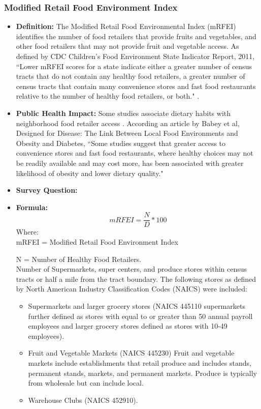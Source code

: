 \documentclass[12pt,letterpaper]{report}
\begin{document}
\subsubsection{Modified Retail Food Environment Index}
	\begin{itemize}
		\item \textbf{Definition:} The Modified Retail Food Environmental Index (mRFEI) identifies the number of food retailers that provide fruits and vegetables, and other food retailers that may not provide fruit and vegetable access. As defined by CDC Children’s Food Environment State Indicator Report, 2011, ``Lower mRFEI scores for a state indicate either a greater number of census tracts that do not contain any healthy food retailers, a greater number of census tracts that contain many convenience stores and fast food restaurants relative to the number of healthy food retailers, or both." \cite{CDCFoodEnvt2011}.
		\item \textbf{Public Health Impact:} Some studies associate dietary habits with neighborhood food retailer access \cite{story2008creating}. According an article by Babey et al, Designed for Disease: The Link Between Local Food Environments and Obesity and Diabetes, ``Some studies suggest that greater access to convenience stores and fast food restaurants, where healthy choices may not be readily available and may cost more, has been associated with greater likelihood of obesity and lower dietary quality."  \cite{babey2008designed} 
		\item \textbf{Survey Question:}
		\item \textbf{Formula:} 
			\begin{equation}
				mRFEI = \frac{N}{D} *100
			\end{equation}
Where: \\
			mRFEI = Modified Retail Food Environment Index
			
			N = Number of Healthy Food Retailers.
\\ Number of Supermarkets, super centers, and produce stores within census tracts or half a mile from the tract boundary. The following stores as defined by North American Industry Classification Codes (NAICS) were included: 
\begin{itemize}
  \item Supermarkets and larger grocery stores (NAICS 445110 supermarkets further defined as stores with equal to or greater than 50 annual payroll employees and larger grocery stores defined as stores with 10-49 employees).
  \item Fruit and Vegetable Markets (NAICS 445230) Fruit and vegetable markets include establishments that retail produce and includes stands, permanent stands, markets, and permanent markets. Produce is typically from wholesale but can include local. 
  \item Warehouse Clubs (NAICS 452910).
\end{itemize}
			

\end{itemize}
\end{document}
